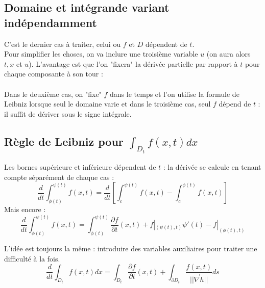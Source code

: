 \documentclass[11pt, a4paper, openany]{book}
\begin{document}
		\subsection{Domaine et intégrande variant indépendamment}
		C'est le dernier cas à traiter, celui ou $f$ et $D$ dépendent de $t$.\\
		Pour simplifier les choses, on va inclure une troisième variable $u$ (on aura alors $t, x$ et $u$). L'avantage est que l'on "fixera" la dérivée partielle par rapport à $t$ pour chaque composante à son tour :\\
									
		\ \\
									
		Dans le deuxième cas, on "fixe" $f$ dans le temps et l'on utilise la formule de Leibniz lorsque seul le domaine varie et dans le troisième cas, seul $f$ dépend de $t$ : il suffit de dériver sous le signe intégrale.
									
		\subsection{Règle de Leibniz pour $\int_{D_t} f(x,t) dx$}
		Les bornes supérieure et inférieure dépendent de $t$ : la dérivée se calcule en tenant compte séparément de chaque cas :
		\begin{equation}
			\frac{d}{dt}\int_{\phi(t)}^{\psi(t)} f(x,t) =  \frac{d}{dt}\left[\int_c^{\psi(t)}f(x,t) - \int_c^{\phi(t)}f(x,t)\right]
		\end{equation}
		Mais encore :
		\begin{equation}
			\frac{d}{dt}\int_{\phi(t)}^{\psi(t)} f(x,t) = \int_{\phi(t)}^{\psi(t)} \frac{\partial f}{\partial t}(x,t) + f|_{(\psi(t),t)} \psi'(t) - f|_{(\phi(t), t)}
		\end{equation}
									
		L'idée est toujours la même : introduire des variables auxiliaires pour traiter une difficulté à la fois.
		\begin{equation}
			\frac{d}{dt}\int_{D_t} f(x,t) dx = \int_{D_t} \frac{\partial f}{\partial t}(x,t) + \int_{\partial D_t} \frac{f(x,t)}{||\vec{\nabla}h||}ds
		\end{equation}
									
\end{document}

